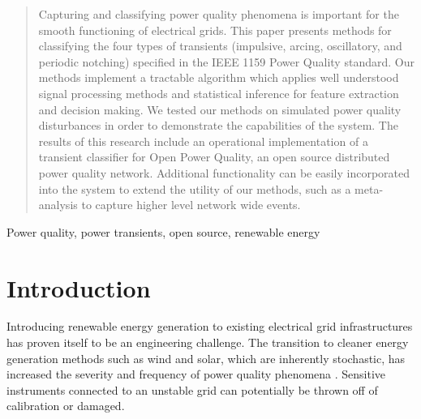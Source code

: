\documentclass[10pt, conference, compsocconf]{IEEEtran}
\begin{document}




\maketitle


\begin{abstract}

Capturing and classifying power quality phenomena is important for the smooth functioning of electrical grids.  This paper presents methods for classifying the four types of transients (impulsive, arcing, oscillatory, and periodic notching) specified in the IEEE 1159 Power Quality standard. Our methods implement a tractable algorithm which applies well understood signal processing methods and statistical inference for feature extraction and decision making. We tested our methods on simulated power quality disturbances in order to demonstrate the capabilities of the system. The results of this research include an operational implementation of a transient classifier for Open Power Quality, an open source distributed power quality network. Additional functionality can be easily incorporated into the system to extend the utility of our methods, such as a meta-analysis to capture higher level network wide events.

\end{abstract}

\begin{IEEEkeywords}
Power quality, power transients, open source, renewable energy%
\end{IEEEkeywords}



%
\IEEEpeerreviewmaketitle



\section{Introduction}

Introducing renewable energy generation to existing electrical grid infrastructures has proven itself to be an engineering challenge. The transition to cleaner energy generation methods such as wind and solar, which are inherently stochastic, has increased the severity and frequency of power quality phenomena \cite{Radu:2014:RenewableImpacts}. Sensitive instruments connected to an unstable grid can potentially be thrown off of calibration or damaged.
\end{document}
